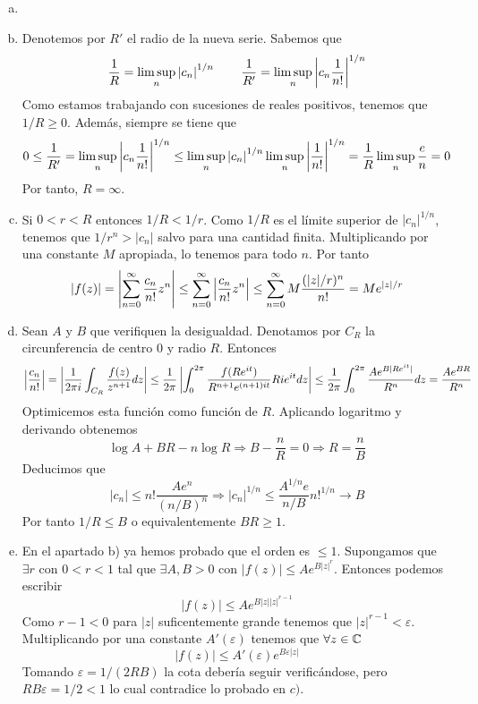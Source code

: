 \documentclass[twoside]{article}
\begin{document}
\begin{solucion}
\begin{enumerate}[a)]
\item[]
\item Denotemos por $R'$ el radio de la nueva serie. Sabemos que
$$
\frac{1}{R} = \limsup_n \left\lvert c_n\right\rvert^{1/n} \qquad\frac{1}{R'} = \limsup_n \left\lvert c_n\frac{1}{n!}\right\rvert^{1/n}
$$
Como estamos trabajando con sucesiones de reales positivos, tenemos que $1/R\geq 0$. Además, siempre se tiene que
$$
0\leq \frac{1}{R'}=\limsup_n \left\lvert c_n\frac{1}{n!}\right\rvert^{1/n} \leq \limsup_n \left\lvert c_n\right\rvert^{1/n}\limsup_n\left\lvert\frac{1}{n!}\right\rvert^{1/n} = \frac{1}{R}\limsup_n \frac{e}{n} = 0
$$
Por tanto, $R=\infty$.
\item Si $0<r<R$ entonces $1/R < 1/r$. Como $1/R$ es el límite superior de $|c_n|^{1/n}$, tenemos que $1/r^n > |c_n|$ salvo para una cantidad finita. Multiplicando por una constante $M$ apropiada, lo tenemos para todo $n$. Por tanto
$$
|f(z)| = \left\lvert\sum_{n=0}^\infty \frac{c_n}{n!}z^n\right\rvert\leq \sum_{n=0}^\infty \left\lvert\frac{c_n}{n!}z^n\right\rvert \leq \sum_{n=0}^\infty M{\frac{(|z|/r)^n}{n!}} = Me^{|z|/r}
$$
\item Sean $A$ y $B$ que verifiquen la desigualdad. Denotamos por $C_R$ la circunferencia de centro $0$ y radio $R$. Entonces
$$
\left\lvert\frac{c_n}{n!}\right\rvert = \left\lvert\frac{1}{2\pi i}\int_{C_R}\frac{f(z)}{z^{n+1}}dz\right\rvert \leq \frac{1}{2\pi} \left\lvert\int_0^{2\pi}\frac{f(Re^{it})}{R^{n+1}e^{(n+1)it}}Rie^{it}dz\right\rvert \leq \frac{1}{2\pi}\int_0^{2\pi}\frac{Ae^{B|Re^{it}|}}{R^{n}}dz = \frac{Ae^{BR}}{R^n}
$$
Optimicemos esta función como función de $R$. Aplicando logaritmo y derivando obtenemos
$$
\log A + BR - n \log R \Rightarrow B - \frac{n}{R} = 0 \Rightarrow R = \frac{n}{B}
$$
Deducimos que
$$
|c_n| \leq n!\frac{Ae^n}{(n/B)^n} \Rightarrow |c_n|^{1/n} \leq \frac{A^{1/n}e}{n/B}n!^{1/n} \to B 
$$
Por tanto $1/R \leq B$ o equivalentemente $BR\geq 1$.
\item En el apartado b) ya hemos probado que el orden es $\leq 1$. Supongamos que $\exists r$ con $0<r<1$ tal que $\exists A,B>0$ con $|f(z)|\leq Ae^{B|z|^r}$. Entonces podemos escribir
$$
|f(z)|\leq Ae^{B|z||z|^{r-1}}
$$
Como $r-1<0$ para $|z|$ suficentemente grande tenemos que $|z|^{r-1}<\varepsilon$. Multiplicando por una constante $A'(\varepsilon)$ tenemos que $\forall z \in \mathbb{C}$
$$
|f(z)|\leq A'(\varepsilon)e^{B \varepsilon|z|}
$$
Tomando $\varepsilon = 1/(2RB)$ la cota debería seguir verificándose, pero $RB\varepsilon = 1/2 < 1$ lo cual contradice lo probado en $c)$.
\end{enumerate}
\end{solucion}
\end{document}
